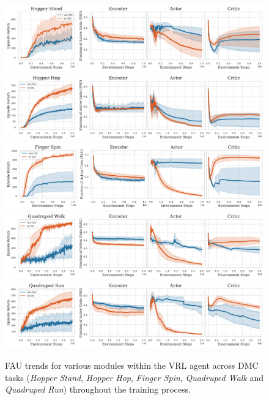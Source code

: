 \newpage
\begin{figure}[ht]
  \centering
  \vspace{2\baselineskip}
  \includegraphics[width=\textwidth]{Figures/5Appendix/FAU_hopper_stand.pdf}
  \includegraphics[width=\textwidth]{Figures/5Appendix/FAU_hopper_hop.pdf} 
  \includegraphics[width=\textwidth]{Figures/5Appendix/FAU_finger_spin.pdf}
  \includegraphics[width=\textwidth]{Figures/5Appendix/FAU_quadruped_walk.pdf}
  \includegraphics[width=\textwidth]{Figures/2Modules/FAU_quadruped_run.pdf}
  \caption{FAU trends for various modules within the VRL agent across DMC tasks (\textit{Hopper Stand}, \textit{Hopper Hop}, \textit{Finger Spin}, \textit{Quadruped Walk} and \textit{Quadruped Run}) throughout the training process.}
  \label{appendix_fig:FAU_task_2}
\end{figure}

